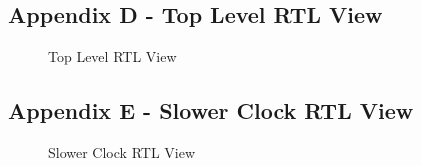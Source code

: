 \documentclass[a4paper,12pt]{article}
\begin{document}
\subsection{Appendix D - Top Level RTL View}
\begin{figure}[H]
	\centering
	\caption{Top Level RTL View}
\end{figure}
\newpage
\subsection{Appendix E - Slower Clock RTL View}
\begin{figure}[H]
	\centering
	\caption{Slower Clock RTL View}
\end{figure}
\begin{flushleft}
\-
\end{flushleft}
\end{document}
